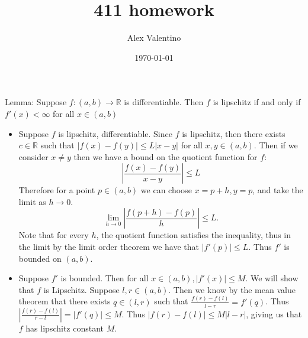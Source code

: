 \documentclass[12pt, letterpaper]{article}
\date{\today}
\author{Alex Valentino}
\title{411 homework}
\newcommand{\R}{\mathbb{R}}
\begin{document}
	Lemma: Suppose $f: (a,b) \to \R$ is differentiable.  Then $f$ is lipschitz 
	if and only if $f'(x) < \infty$ for all $x \in (a,b)$
	\begin{itemize}
		\item Suppose $f$ is lipschitz, differentiable.  Since $f$ is lipschitz, 
		then there exists $c \in \R$ such that $|f(x) - f(y)| \leq L|x-y|$ 
		for all $x,y \in (a,b)$.  Then if we consider $x\neq y$ then we have 
		a bound on the quotient function for $f$: 
		$$
		\left| \frac{f(x) - f(y)}{x-y} \right| \leq L
		$$
		Therefore for a point $p \in (a,b)$ we can choose $x = p+h, y = p$, and 
		take the limit as $h \to 0$.  
		$$
		\lim_{h \to 0} \left| \frac{f(p+h) - f(p)}{h} \right| \leq L.
		$$
		Note that for every $h$, the quotient function satisfies the inequality,
		thus in the limit by the limit order theorem we have 
		that $|f'(p)| \leq L$.  Thus $f'$ is bounded on $(a,b)$.
		\item Suppose $f'$ is bounded.  
		Then for all $x \in (a,b), |f'(x)| \leq M$.  We will show that $f$ is 
		Lipschitz.  Suppose $l,r \in (a,b)$.  Then we know by the mean value 
		theorem that there exists $q \in (l,r)$ such that $\frac{f(r) - f(l)}{l -r} = f'(q)$.  Thus $\left|\frac{f(r) - f(l)}{r -l} \right| = |f'(q)| \leq M$.
		Thus $|f(r) - f(l) | \leq M|l-r|$, giving us that $f$ has lipschitz 
		constant $M$.  
		
	\end{itemize}
\end{document}
